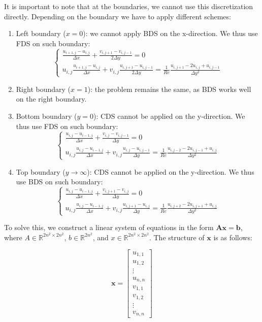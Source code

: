\documentclass{article}
\begin{document}
It is important to note that at the boundaries, we cannot use this discretization directly. Depending on the boundary we have to apply different schemes:
\begin{enumerate}
  \item Left boundary (\( x = 0 \)): we cannot apply BDS on the x-direction. We thus use FDS on such boundary:
  \[
\begin{cases}
  \frac{u_{i+1,j} - u_{i,j}}{\Delta x} + \frac{v_{i,j+1} - v_{i,j-1}}{2 \Delta y} = 0 \\
  u_{i,j}\frac{u_{i+1,j} - u_{i,j}}{\Delta x}  + v_{i,j} \frac{u_{i,j+1} - u_{i,j-1}}{2 \Delta y} = \frac{1}{Re} \frac{u_{i,j+1} - 2u_{i,j} + u_{i,j-1}}{\Delta y^2}
\end{cases}
\]
  
\item Right boundary (\( x = 1 \)): the problem remains the same, as BDS works well on the right boundary.
  
\item Bottom boundary (\( y = 0 \)): CDS cannot be applied on the y-direction. We thus use FDS on such boundary:
\[
  \begin{cases}
    \frac{u_{i,j} - u_{i-1,j}}{\Delta x} + \frac{v_{i,j} - v_{i,j-1}}{\Delta y} = 0 \\
    u_{i,j}\frac{u_{i,j} - u_{i-1,j}}{\Delta x}  + v_{i,j} \frac{u_{i,j} - u_{i,j-1}}{\Delta y} = \frac{1}{Re} \frac{u_{i,j-2} - 2u_{i,j-1} + u_{i,j}}{\Delta y^2}
  \end{cases}
\]
  
\item Top boundary (\( y \to \infty \)): CDS cannot be applied on the y-direction. We thus use BDS on such boundary:
\[
  \begin{cases}
    \frac{u_{i,j} - u_{i-1,j}}{\Delta x} + \frac{v_{i,j+1} - v_{i,j}}{\Delta y} = 0 \\
    u_{i,j}\frac{u_{i,j} - u_{i-1,j}}{\Delta x}  + v_{i,j} \frac{u_{i,j+1} - u_{i,j}}{\Delta y} = \frac{1}{Re} \frac{u_{i,j+2} - 2u_{i,j+1} + u_{i,j}}{\Delta y^2}
  \end{cases}
\]
\end{enumerate}

To solve this, we construct a linear system of equations in the form \( \mathbf{A} \mathbf{x} = \mathbf{b} \), where \( A \in \mathbb{R}^{2n^2 \times 2n^2} \), \( b \in \mathbb{R}^{2n^2} \), and \( x \in \mathbb{R}^{2n^2 \times 2n^2} \). The structure of \( \mathbf{x} \) is as follows:

\[
\mathbf{x} = \begin{bmatrix}
u_{1,1} \\
u_{1,2} \\
\vdots \\
u_{n,n} \\
v_{1,1} \\
v_{1,2} \\
\vdots \\
v_{n,n}
\end{bmatrix}
\]
\end{document}
